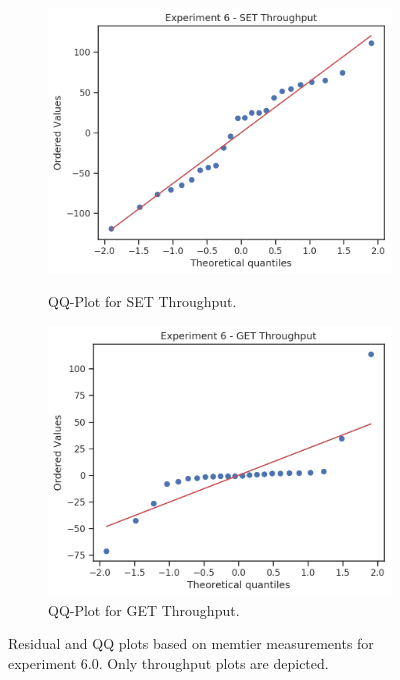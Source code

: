 \begin{figure}
        \begin{subfigure}[t!]{0.45\textwidth}
            \centering
            \includegraphics[width=\textwidth]{../data_analysis/figures/6-0_throughput-set-qq.png}
            \caption{QQ-Plot for SET Throughput.\label{fig:6_qq_set_tp}}
            \includegraphics[width=\textwidth]{../data_analysis/figures/6-0_throughput-get-qq.png}
            \caption{QQ-Plot for GET Throughput.\label{fig:6_qq_get_tp}}
        \end{subfigure}
        \caption{Residual and QQ plots based on memtier measurements for experiment 6.0. Only throughput plots
                 are depicted.\label{fig:6_tp}}
    \end{figure}
